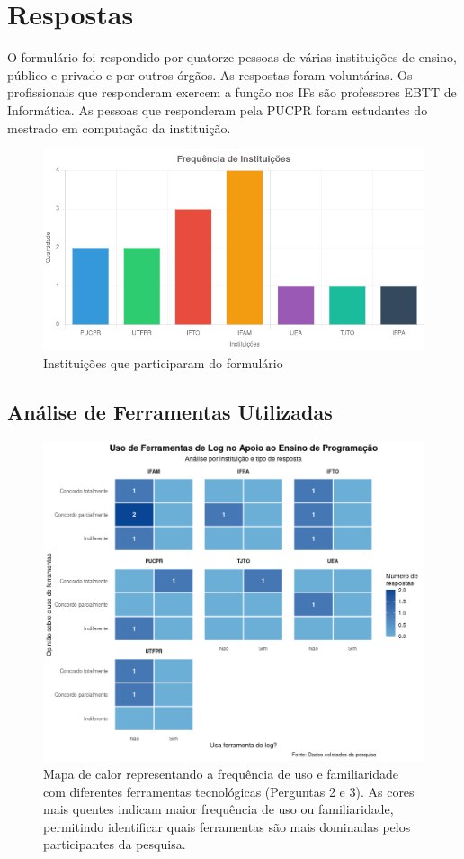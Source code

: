 \section{Respostas}
O formulário foi respondido por quatorze pessoas de várias instituições de ensino, público e privado e por outros órgãos. As respostas foram voluntárias. Os profissionais que responderam exercem a função nos IFs são professores EBTT de Informática. As pessoas que responderam pela PUCPR foram estudantes do mestrado em computação da instituição. 
\begin{figure}[H]
    \centering
    \includegraphics[width=1\linewidth]{../figuras/instituicoes.png}
    \caption{Instituições que participaram do formulário}
    \label{fig:participacoes}
\end{figure}

\subsection{Análise de Ferramentas Utilizadas}
\begin{figure}[H]
    \centering
    \includegraphics[width=1\linewidth]{../figuras/ferramentas.png}
    \caption{Mapa de calor representando a frequência de uso e familiaridade com diferentes ferramentas tecnológicas (Perguntas 2 e 3). As cores mais quentes indicam maior frequência de uso ou familiaridade, permitindo identificar quais ferramentas são mais dominadas pelos participantes da pesquisa.}
    \label{fig:heatmap-tools}
\end{figure}

